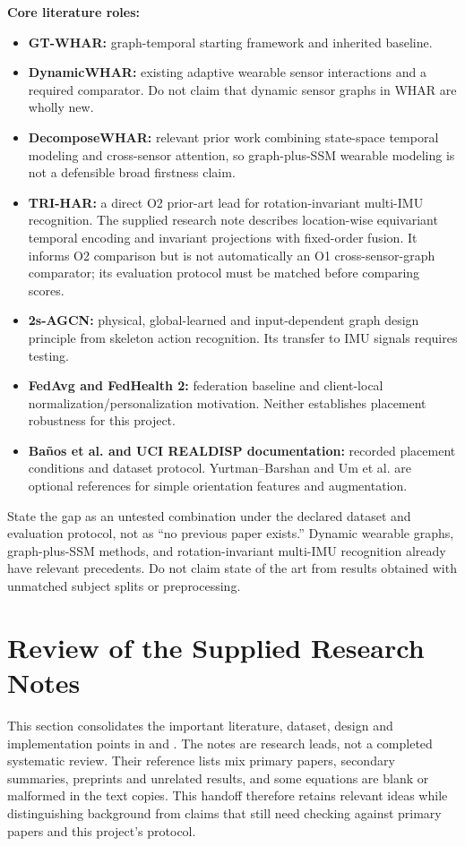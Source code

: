 \documentclass[10pt,a4paper]{article}
\begin{document}
\textbf{Core literature roles:}
\begin{itemize}
\item \textbf{GT-WHAR:} graph-temporal starting framework and inherited baseline.
\item \textbf{DynamicWHAR:} existing adaptive wearable sensor interactions and a required comparator. Do not claim that dynamic sensor graphs in WHAR are wholly new.
\item \textbf{DecomposeWHAR:} relevant prior work combining state-space temporal modeling and cross-sensor attention, so graph-plus-SSM wearable modeling is not a defensible broad firstness claim.
\item \textbf{TRI-HAR:} a direct O2 prior-art lead for rotation-invariant multi-IMU recognition. The supplied research note describes location-wise equivariant temporal encoding and invariant projections with fixed-order fusion. It informs O2 comparison but is not automatically an O1 cross-sensor-graph comparator; its evaluation protocol must be matched before comparing scores.
\item \textbf{2s-AGCN:} physical, global-learned and input-dependent graph design principle from skeleton action recognition. Its transfer to IMU signals requires testing.
\item \textbf{FedAvg and FedHealth 2:} federation baseline and client-local normalization/personalization motivation. Neither establishes placement robustness for this project.
\item \textbf{Ba\~nos et al. and UCI REALDISP documentation:} recorded placement conditions and dataset protocol. Yurtman--Barshan and Um et al. are optional references for simple orientation features and augmentation.
\end{itemize}

State the gap as an untested combination under the declared dataset and evaluation protocol, not as ``no previous paper exists.'' Dynamic wearable graphs, graph-plus-SSM methods, and rotation-invariant multi-IMU recognition already have relevant precedents. Do not claim state of the art from results obtained with unmatched subject splits or preprocessing.

\section{Review of the Supplied Research Notes}
This section consolidates the important literature, dataset, design and implementation points in  and . The notes are research leads, not a completed systematic review. Their reference lists mix primary papers, secondary summaries, preprints and unrelated results, and some equations are blank or malformed in the text copies. This handoff therefore retains relevant ideas while distinguishing background from claims that still need checking against primary papers and this project's protocol.
\end{document}
